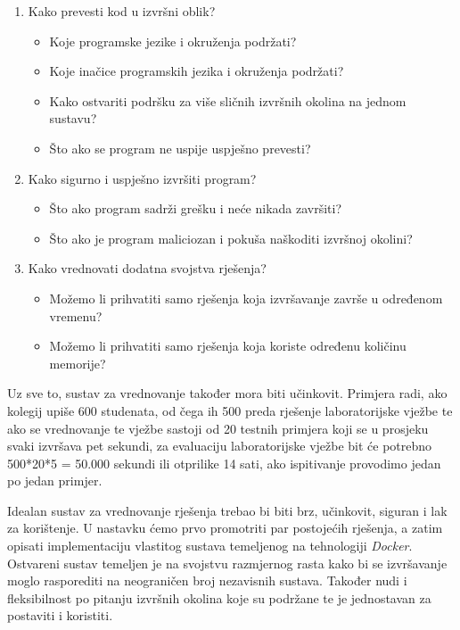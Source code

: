 \documentclass[times, utf8, zavrsni]{fer}
\begin{document}
\begin{enumerate}
\item Kako prevesti kod u izvršni oblik?
	\begin{itemize}
	\item Koje programske jezike i okruženja podržati?
	\item Koje inačice programskih jezika i okruženja podržati?
	\item Kako ostvariti podršku za više sličnih izvršnih okolina na jednom sustavu?
	\item Što ako se program ne uspije uspješno prevesti?
	\end{itemize}
\item Kako sigurno i uspješno izvršiti program?
	\begin{itemize}
	\item Što ako program sadrži grešku i neće nikada završiti?
	\item Što ako je program maliciozan i pokuša naškoditi izvršnoj okolini?
	\end{itemize}
\item Kako vrednovati dodatna svojstva rješenja?
	\begin{itemize}
	\item Možemo li prihvatiti samo rješenja koja izvršavanje završe u određenom vremenu?
	\item Možemo li prihvatiti samo rješenja koja koriste određenu količinu memorije?
	\end{itemize}
\end{enumerate}

Uz sve to, sustav za vrednovanje također mora biti učinkovit. Primjera radi, ako kolegij upiše 600 studenata, od čega ih 500 preda rješenje laboratorijske vježbe te ako se vrednovanje te vježbe sastoji od 20 testnih primjera koji se u prosjeku svaki izvršava pet sekundi, za evaluaciju laboratorijske vježbe bit će potrebno 500*20*5 = 50.000 sekundi ili otprilike 14 sati, ako ispitivanje provodimo jedan po jedan primjer.

Idealan sustav za vrednovanje rješenja trebao bi biti brz, učinkovit, siguran i lak za korištenje. U nastavku ćemo prvo promotriti par postojećih rješenja, a zatim opisati implementaciju vlastitog sustava temeljenog na tehnologiji {\textit{Docker}}. Ostvareni sustav temeljen je na svojstvu razmjernog rasta kako bi se izvršavanje moglo rasporediti na neograničen broj nezavisnih sustava. Također nudi i fleksibilnost po pitanju izvršnih okolina koje su podržane te je jednostavan za postaviti i koristiti.
\end{document}
